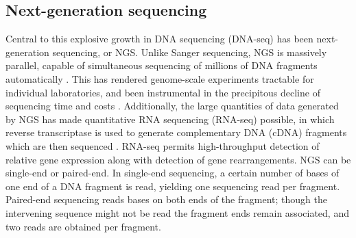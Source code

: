 \subsection{Next-generation sequencing}
Central to this explosive growth in DNA sequencing (DNA-seq) has been next-generation sequencing, or NGS\@. Unlike Sanger sequencing, NGS is massively parallel, capable of simultaneous sequencing of millions of DNA fragments automatically \cite{wheeler2008}. This has rendered genome-scale experiments tractable for individual laboratories, and been instrumental in the precipitous decline of sequencing time and costs \cite{vandijk2014}. Additionally, the large quantities of data generated by NGS has made quantitative RNA sequencing (RNA-seq) possible, in which reverse transcriptase is used to generate complementary DNA (cDNA) fragments which are then sequenced \cite{wang2009}. RNA-seq permits high-throughput detection of relative gene expression along with detection of gene rearrangements. NGS can be single-end or paired-end. In single-end sequencing, a certain number of bases of one end of a DNA fragment is read, yielding one sequencing read per fragment. Paired-end sequencing reads bases on both ends of the fragment; though the intervening sequence might not be read the fragment ends remain associated, and two reads are obtained per fragment.

